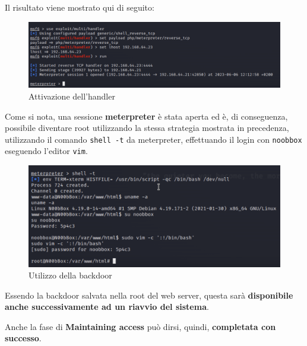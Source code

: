 \documentclass[a4paper, 12pt, oneside]{article}
\begin{document}
Il risultato viene mostrato qui di seguito:

\begin{figure}[h!]
    \centering
    \includegraphics[width=\textwidth]{img/handler.png}
    \caption{Attivazione dell'handler}
\end{figure}

Come si nota, una sessione \textbf{meterpreter} è stata aperta ed è, di conseguenza, possibile diventare root utilizzando la stessa strategia mostrata in precedenza, utilizzando il comando \texttt{shell -t} da meterpreter, effettuando il login con \texttt{noobbox} eseguendo l'editor \texttt{vim}.

\newpage
\begin{figure}[h!]
    \centering
    \includegraphics[width=\textwidth]{img/backdoor_root.png}
    \caption{Utilizzo della backdoor}
\end{figure}

Essendo la backdoor salvata nella root del web server, questa sarà \textbf{disponibile anche successivamente ad un riavvio del sistema}.

Anche la fase di \textbf{Maintaining access} può dirsi, quindi, \textbf{completata con successo}.

\newpage
\printbibliography[title={Riferimenti bibliografici e risorse consultate}]
\end{document}

